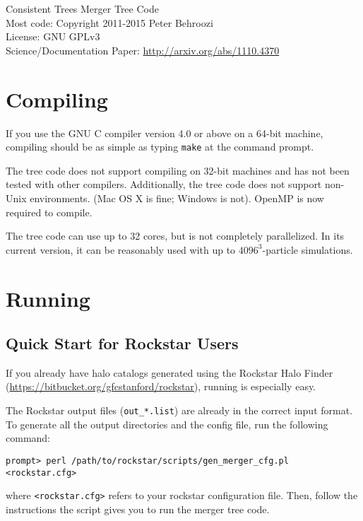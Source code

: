 \documentclass[12pt]{article}
\begin{document}
\vspace{-1ex}
\noindent{}Consistent Trees Merger Tree Code\\
\noindent{}Most code: Copyright \textcopyright{}2011-2015 Peter Behroozi\\
\noindent{}License: GNU GPLv3\\
\noindent{}Science/Documentation Paper: \url{http://arxiv.org/abs/1110.4370}\\

\tableofcontents
\newcommand{\ttt}[1]{\texttt{#1}}

\section{Compiling}
      If you use the GNU C compiler version 4.0 or above on a 64-bit machine,
   compiling should be as simple as typing \ttt{make} at the command prompt.

   The tree code does not support compiling on 32-bit machines and has not been
   tested with other compilers.  Additionally, the tree code does not support
   non-Unix environments. (Mac OS X is fine; Windows is not).  OpenMP is
   now required to compile.

   The tree code can use up to 32 cores, but is not completely parallelized.
   In its current version, it can be reasonably used with up to $4096^3$-particle
   simulations.

\section{Running}
\subsection{Quick Start for Rockstar Users}
      If you already have halo catalogs generated using the Rockstar Halo
      Finder (\url{https://bitbucket.org/gfcstanford/rockstar}), running is especially easy.

      The Rockstar output files (\ttt{out\_*.list}) are already in the correct input
      format.  To generate all the output directories and the config file,
      run the following command:
\begin{verbatim}
prompt> perl /path/to/rockstar/scripts/gen_merger_cfg.pl <rockstar.cfg>
\end{verbatim}
       where \ttt{<rockstar.cfg>} refers to your rockstar configuration file.
      Then, follow the instructions the script gives you to run the merger tree
      code.
\end{document}
